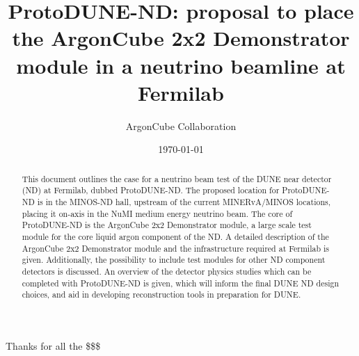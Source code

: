 \documentclass[aps,prd,preprint,superscriptaddress,nofootinbib]{revtex4-1}
\begin{document}
\title{ProtoDUNE-ND: proposal to place the ArgonCube 2x2 Demonstrator module in a neutrino beamline at Fermilab}

\author{ArgonCube Collaboration}

\date{\today}

\begin{abstract}
  This document outlines the case for a neutrino beam test of the DUNE near detector (ND) at Fermilab, dubbed ProtoDUNE-ND. The proposed location for ProtoDUNE-ND is in the MINOS-ND hall, upstream of the current MINERvA/MINOS locations, placing it on-axis in the NuMI medium energy neutrino beam. The core of ProtoDUNE-ND is the ArgonCube 2x2 Demonstrator module, a large scale test module for the core liquid argon component of the ND.  A detailed description of the ArgonCube 2x2 Demonstrator module and the infrastructure required at Fermilab is given. Additionally, the possibility to include test modules for other ND component detectors is discussed. An overview of the detector physics studies which can be completed with ProtoDUNE-ND is given, which will inform the final DUNE ND design choices, and aid in developing reconstruction tools in preparation for DUNE.
  
\end{abstract}

\maketitle








\begin{acknowledgments}
Thanks for all the \$\$\$
\end{acknowledgments}


%
\end{document}
